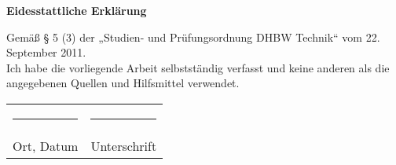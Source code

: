 \newpage

\vspace*{\fill}																%

{

\begin{center}
	\huge {\bf Eidesstattliche Erklärung}
	\label{cha:eidesstattlicheErklaerung}
\end{center}

\vspace{2cm}

Gemäß § 5 (3) der „Studien- und Prüfungsordnung DHBW Technik“ vom 22. September 2011.\\
Ich habe die vorliegende Arbeit selbstständig verfasst und keine anderen als die angegebenen 
Quellen und Hilfsmittel verwendet. \\
\vspace{2cm}


\begin{table}[h]
		\begin{tabular}{ll}
\rule{6.5cm}{0.3pt} & \rule{6.5cm}{0.3pt}\\
Ort, Datum  & Unterschrift\\
		\end{tabular}
\end{table}

}

\vspace*{\fill}
\newpage